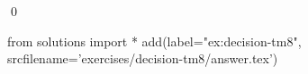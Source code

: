
\begin{ex} 
  \label{ex:decision-tm8}
  
  \qed
\end{ex} 
\begin{python0}
from solutions import *
add(label="ex:decision-tm8",
    srcfilename='exercises/decision-tm8/answer.tex') 
\end{python0}
